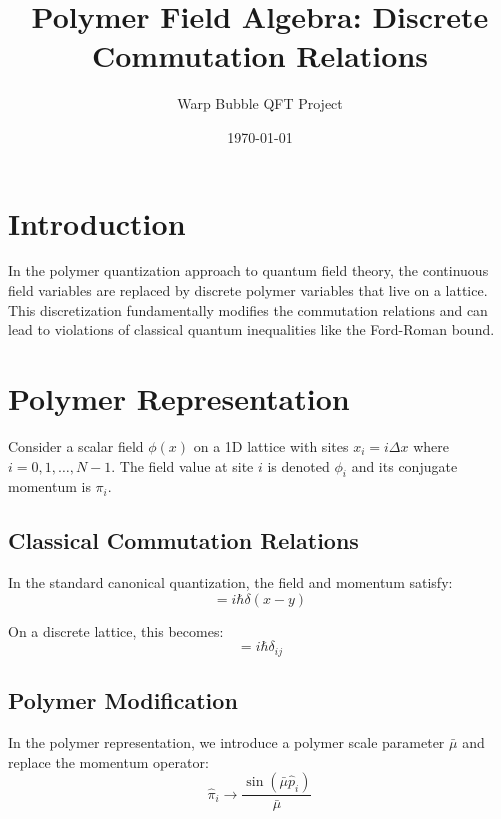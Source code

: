 \documentclass[12pt]{article}
\title{Polymer Field Algebra: Discrete Commutation Relations}
\author{Warp Bubble QFT Project}
\date{\today}
\begin{document}
\maketitle

\section{Introduction}

In the polymer quantization approach to quantum field theory, the continuous field variables are replaced by discrete polymer variables that live on a lattice. This discretization fundamentally modifies the commutation relations and can lead to violations of classical quantum inequalities like the Ford-Roman bound.

\section{Polymer Representation}

Consider a scalar field $\phi(x)$ on a 1D lattice with sites $x_i = i \Delta x$ where $i = 0, 1, \ldots, N-1$. The field value at site $i$ is denoted $\phi_i$ and its conjugate momentum is $\pi_i$.

\subsection{Classical Commutation Relations}

In the standard canonical quantization, the field and momentum satisfy:
\begin{equation}
[\hat{\phi}(x), \hat{\pi}(y)] = i\hbar \delta(x-y)
\end{equation}

On a discrete lattice, this becomes:
\begin{equation}
[\hat{\phi}_i, \hat{\pi}_j] = i\hbar \delta_{ij}
\end{equation}

\subsection{Polymer Modification}

In the polymer representation, we introduce a polymer scale parameter $\bar{\mu}$ and replace the momentum operator:
\begin{equation}
\hat{\pi}_i \longrightarrow \frac{\sin(\bar{\mu} \hat{p}_i)}{\bar{\mu}}
\end{equation}
\end{document}
